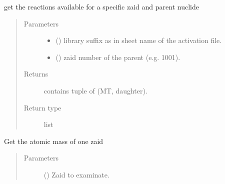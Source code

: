\documentclass[letterpaper,10pt,english]{sphinxmanual}
\begin{document}
\begin{fulllineitems}
\begin{fulllineitems}
\label{\detokenize{api/initobjects:libmanager.LibManager.get_reactions}}
get the reactions available for a specific zaid and parent nuclide
\begin{quote}\begin{description}
\item[{Parameters}] \leavevmode\begin{itemize}
\item {} 
 () \textendash{} library suffix as in sheet name of the activation file.

\item {} 
 () \textendash{} zaid number of the parent (e.g. 1001).

\end{itemize}

\item[{Returns}] \leavevmode
{} \textendash{} contains tuple of (MT, daughter).

\item[{Return type}] \leavevmode
list

\end{description}\end{quote}

\end{fulllineitems}


\begin{fulllineitems}
\label{\detokenize{api/initobjects:libmanager.LibManager.get_zaid_mass}}
Get the atomic mass of one zaid
\begin{quote}\begin{description}
\item[{Parameters}] \leavevmode
{} ({\hyperref[\detokenize{api/inputgeneration:matreader.Zaid}]{}}) \textendash{} Zaid to examinate.


\end{description}
\end{quote}
\end{fulllineitems}
\end{fulllineitems}
\end{document}
